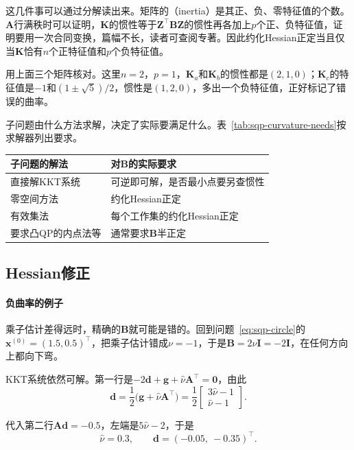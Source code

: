 这几件事可以通过分解读出来。矩阵的（inertia）是其正、负、零特征值的个数。$\bm{A}$行满秩时可以证明，$\bm{K}$的惯性等于$\bm{Z}^\top\bm{B}\bm{Z}$的惯性再各加上$p$个正、负特征值，证明要用一次合同变换，篇幅不长，读者可查阅专著。因此约化Hessian正定当且仅当$\bm{K}$恰有$n$个正特征值和$p$个负特征值。

用上面三个矩阵核对。这里$n=2$，$p=1$，$\bm{K}_a$和$\bm{K}_b$的惯性都是$(2,1,0)$；$\bm{K}_c$的特征值是$-1$和$(1\pm\sqrt5)/2$，惯性是$(1,2,0)$，多出一个负特征值，正好标记了错误的曲率。

子问题由什么方法求解，决定了实际要满足什么。表~\ref{tab:sqp-curvature-needs}按求解器列出要求。

\begin{BookInlineTable}
 \centering
 \begin{tabular}{ll}
  \toprule
  子问题的解法 & 对$\bm{B}$的实际要求\\
  \midrule
  直接解KKT系统 & 可逆即可解，是否最小点要另查惯性\\
  零空间方法 & 约化Hessian正定\\
  有效集法 & 每个工作集的约化Hessian正定\\
  要求凸QP的内点法等 & 通常要求$\bm{B}$半正定\\
  \bottomrule
 \end{tabular}
 \caption{不同子问题解法对曲率的要求。}
 \label{tab:sqp-curvature-needs}
\end{BookInlineTable}

\subsection{Hessian修正}
\label{sec:sqp-hessian-modification}

\paragraph{负曲率的例子}
乘子估计差得远时，精确的$\bm{B}$就可能是错的。回到问题~\eqref{eq:sqp-circle}的$\bm{x}^{(0)}=(1.5,0.5)^\top$，把乘子估计错成$\nu=-1$，于是$\bm{B}=2\nu\bm{I}=-2\bm{I}$，在任何方向上都向下弯。

KKT系统依然可解。第一行是$-2\bm{d}+\bm{g}+\hat\nu\bm{A}^\top=\bm{0}$，由此
\[
 \bm{d}=\frac12\bigl(\bm{g}+\hat\nu\bm{A}^\top\bigr)=\frac12\begin{bmatrix}3\hat\nu-1\\\hat\nu-1\end{bmatrix}.
\]

代入第二行$\bm{A}\bm{d}=-0.5$，左端是$5\hat\nu-2$，于是
\[
 \hat\nu=0.3,\qquad\bm{d}=(-0.05,\ -0.35)^\top.
\]

